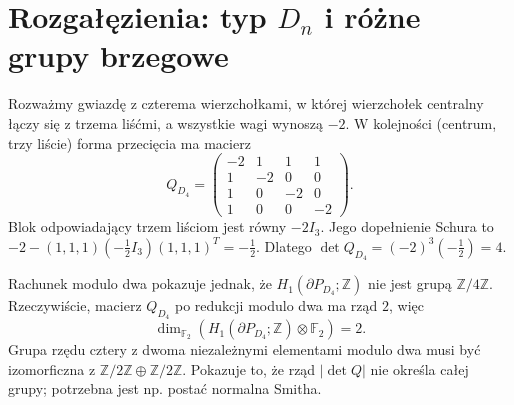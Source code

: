 \begin{center}
\end{center}

\section{Rozgałęzienia: typ \texorpdfstring{$D_n$}{Dn} i różne grupy brzegowe}
\label{sec:tg-plumbing-Dn}

\begin{przyklad}
Rozważmy gwiazdę z czterema wierzchołkami, w której
wierzchołek centralny łączy się z trzema liśćmi,
a wszystkie wagi wynoszą $-2$. W kolejności
(centrum, trzy liście) forma przecięcia ma macierz
\[
Q_{D_4}=\begin{pmatrix}
-2&1&1&1\\1&-2&0&0\\1&0&-2&0\\1&0&0&-2
\end{pmatrix}.
\]
Blok odpowiadający trzem liściom jest równy $-2I_3$.
Jego dopełnienie Schura to
$-2-(1,1,1)(-\tfrac12I_3)(1,1,1)^T=-\tfrac12$.
Dlatego $\det Q_{D_4}=(-2)^3(-\tfrac12)=4$.

Rachunek modulo dwa pokazuje jednak, że
$H_1(\partial P_{D_4};\mathbb Z)$ nie jest grupą
$\mathbb Z/4\mathbb Z$. Rzeczywiście, macierz
$Q_{D_4}$ po redukcji modulo dwa ma rząd $2$, więc
\[
\dim_{\mathbb F_2}
(H_1(\partial P_{D_4};\mathbb Z)\otimes\mathbb F_2)=2.
\]
Grupa rzędu cztery z dwoma niezależnymi elementami
modulo dwa musi być izomorficzna z
$\mathbb Z/2\mathbb Z\oplus\mathbb Z/2\mathbb Z$.
Pokazuje to, że rząd $|\det Q|$ nie określa całej
grupy; potrzebna jest np. postać normalna Smitha.
\end{przyklad}

\begin{center}
\end{center}

